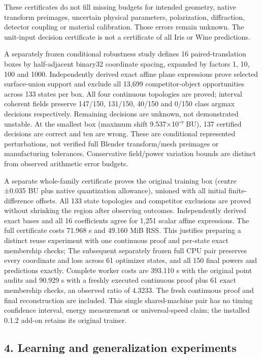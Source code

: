 \documentclass[
  10pt,
]{article}
\begin{document}
These certificates do not fill missing budgets for intended geometry,
native transform preimages, uncertain physical parameters, polarization,
diffraction, detector coupling or material calibration. Those errors
remain unknown. The unit-input decision certificate is not a certificate
of all Iris or Wine predictions.

A separately frozen conditional robustness study defines 16
paired-translation boxes by half-adjacent binary32 coordinate spacing,
expanded by factors 1, 10, 100 and 1000. Independently derived exact
affine plane expressions prove selected surface-union support and
exclude all 13,699 competitor-object opportunities across 133 states per
box. All four continuous topologies are proved; interval coherent fields
preserve 147/150, 131/150, 40/150 and 0/150 class argmax decisions
respectively. Remaining decisions are unknown, not demonstrated
unstable. At the smallest box (maximum shift 9.537×10⁻⁷ BU), 137
certified decisions are correct and ten are wrong. These are conditional
represented perturbations, not verified full Blender transform/mesh
preimages or manufacturing tolerances. Conservative field/power
variation bounds are distinct from observed arithmetic error budgets.

A separate whole-family certificate proves the original training box
(centre ±0.035 BU plus native quantization allowance), unioned with all
initial finite-difference offsets. All 133 state topologies and
competitor exclusions are proved without shrinking the region after
observing outcomes. Independently derived exact bases and all 16
coefficients agree for 1,251 scalar affine expressions. The full
certificate costs 71.968 s and 49.160 MiB RSS. This justifies preparing
a distinct reuse experiment with one continuous proof and per-state
exact membership checks; The subsequent separately frozen full CPU pair
preserves every coordinate and loss across 61 optimizer states, and all
150 final powers and predictions exactly. Complete worker costs are
393.110 s with the original point audits and 90.929 s with a freshly
executed continuous proof plus 61 exact membership checks, an observed
ratio of 4.3233. The fresh continuous proof and final reconstruction are
included. This single shared-machine pair has no timing confidence
interval, energy measurement or universal-speed claim; the installed
0.1.2 add-on retains its original trainer.

\hypertarget{learning-and-generalization-experiments}{%
\subsection{4. Learning and generalization
experiments}\label{learning-and-generalization-experiments}}
\end{document}
